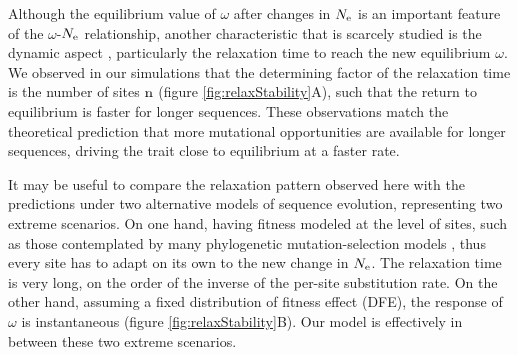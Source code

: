 Although the equilibrium value of $\omega$ after changes in $N_{\mathrm{e}}$ is an important feature of the $\omega$-$N_{\mathrm{e}}$ relationship, another characteristic that is scarcely studied is the dynamic aspect \citep{Jones2016}, particularly the relaxation time to reach the new equilibrium $\omega$.
We observed in our simulations that the determining factor of the relaxation time is the number of sites $\text{n}$ (figure \ref{fig:relaxStability}A), such that the return to equilibrium is faster for longer sequences.
These observations match the theoretical prediction that more mutational opportunities are available for longer sequences, driving the trait close to equilibrium at a faster rate.

It may be useful to compare the relaxation pattern observed here with the predictions under two alternative models of sequence evolution, representing two extreme scenarios.
On one hand, having fitness modeled at the level of sites, such as those contemplated by many phylogenetic mutation-selection models \citep{Halpern1998, Rodrigue2010, Tamuri2012}, thus every site has to adapt on its own to the new change in $N_{\mathrm{e}}$.
The relaxation time is very long, on the order of the inverse of the per-site substitution rate.
On the other hand, assuming a fixed distribution of fitness effect (DFE), the response of $\omega$ is instantaneous (figure \ref{fig:relaxStability}B).
Our model is effectively in between these two extreme scenarios.

